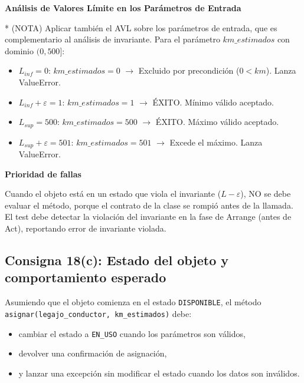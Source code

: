 \textbf{Análisis de Valores Límite en los Parámetros de Entrada}

* (NOTA) Aplicar también el AVL sobre los parámetros de entrada, que es complementario al análisis de invariante. Para el parámetro $km\_estimados$ con dominio $(0, 500]$:

\begin{itemize}
    \item $L_{inf} = 0$: $km\_estimados = 0$ $\rightarrow$ Excluido por precondición ($0 < km$). Lanza ValueError.
    \item $L_{inf} + \varepsilon = 1$: $km\_estimados = 1$ $\rightarrow$ ÉXITO. Mínimo válido aceptado.
    \item $L_{sup} = 500$: $km\_estimados = 500$ $\rightarrow$ ÉXITO. Máximo válido aceptado.
    \item $L_{sup} + \varepsilon = 501$: $km\_estimados = 501$ $\rightarrow$ Excede el máximo. Lanza ValueError.
\end{itemize}

\textbf{Prioridad de fallas}

Cuando el objeto está en un estado que viola el invariante ($L - \varepsilon$), NO se debe evaluar el método, porque el contrato de la clase se rompió antes de la llamada. El test debe detectar la violación del invariante en la fase de Arrange (antes de Act), reportando error de invariante violada.

\subsection{Consigna 18(c): Estado del objeto y comportamiento esperado}

Asumiendo que el objeto comienza en el estado \texttt{DISPONIBLE}, el método \texttt{asignar(legajo\_conductor, km\_estimados)} debe:
\begin{itemize}
    \item cambiar el estado a \texttt{EN\_USO} cuando los parámetros son válidos,
    \item devolver una confirmación de asignación,
    \item y lanzar una excepción sin modificar el estado cuando los datos son inválidos.
\end{itemize}

